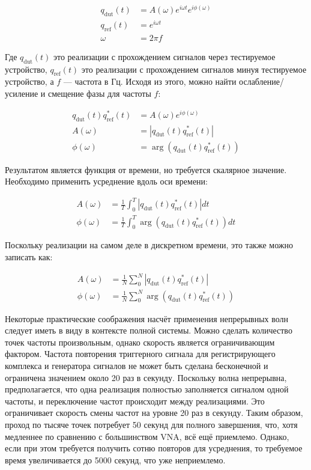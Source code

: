 \documentclass{report}
\begin{document}
\begin{align}
q_\text{dut}(t) &= A(\omega) e^{i \omega t} e^{i \phi(\omega) } \\
q_\text{ref}(t) &= e^{i \omega t} \\
\omega &= 2 \pi f
\end{align}

Где $q_\text{dut}(t)$ это реализации с прохождением сигналов через тестируемое устройство, $q_\text{ref}(t)$ это реализации с прохождением сигналов минуя тестируемое устройство, а $f$ --- частота в Гц. Исходя из этого, можно найти ослабление/усиление и смещение фазы для частоты $f$:

\begin{align}
q_\text{dut}(t) q^*_\text{ref}(t) &= A(\omega) e^{i \phi(\omega) } \\
A(\omega) &= \left| q_\text{dut}(t) q^*_\text{ref}(t) \right| \\
\phi(\omega) &= \arg\left( q_\text{dut}(t) q^*_\text{ref}(t) \right)
\end{align}

Результатом является функция от времени, но требуется скалярное значение. Необходимо применить усреднение вдоль оси времени:

\begin{align}
A(\omega) &= \frac{1}{T} \int_{0}^{T} \left| q_\text{dut}(t) q^*_\text{ref}(t) \right| dt \\
\phi(\omega) &= \frac{1}{T} \int_{0}^{T} \arg\left( q_\text{dut}(t) q^*_\text{ref}(t) \right) dt
\end{align}

Поскольку реализации на самом деле в дискретном времени, это также можно записать как:

\begin{align}
A(\omega) &= \frac{1}{N} \sum_{0}^{N} \left| q_\text{dut}(t) q^*_\text{ref}(t) \right| \\
\phi(\omega) &= \frac{1}{N} \sum_{0}^{N} \arg\left( q_\text{dut}(t) q^*_\text{ref}(t) \right)
\end{align}

Некоторые практические соображения насчёт применения непрерывных волн следует иметь в виду в контексте полной системы. Можно сделать количество точек частоты произвольным, однако скорость является ограничивающим фактором. Частота повторения триггерного сигнала для регистрирующего комплекса и генератора сигналов не может быть сделана бесконечной и ограничена значением около 20 раз в секунду. Поскольку волна непрерывна, предполагается, что одна реализация полностью заполняется сигналом одной частоты, и переключение частот происходит между реализациями. Это ограничивает скорость смены частот на уровне 20 раз в секунду. Таким образом, проход по тысяче точек потребует 50 секунд для полного завершения, что, хотя медленнее по сравнению с большинством VNA, всё ещё приемлемо. Однако, если при этом требуется получить сотню повторов для усреднения, то требуемое время увеличивается до 5000 секунд, что уже неприемлемо.
\end{document}
